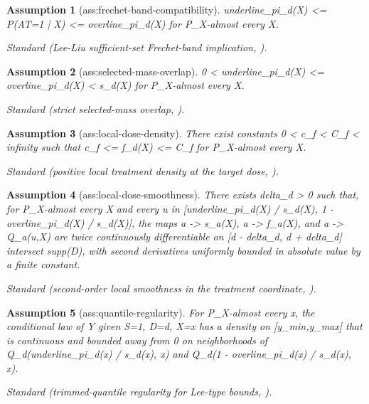\documentclass{article}
\newtheorem{assumption}{Assumption}
\begin{document}
\begin{assumption}[ass:frechet-band-compatibility]\label{ass:frechet-band-compatibility}
underline_pi_d(X) <= P(AT=1 | X) <= overline_pi_d(X) for P_X-almost every X.
\par\smallskip\noindent\emph{Standard} (Lee-Liu sufficient-set Frechet-band implication, \cite{LeeLiu2025ContinuousLee}).
\end{assumption}

\begin{assumption}[ass:selected-mass-overlap]\label{ass:selected-mass-overlap}
0 < underline_pi_d(X) <= overline_pi_d(X) < s_d(X) for P_X-almost every X.
\par\smallskip\noindent\emph{Standard} (strict selected-mass overlap, \cite{LeeLiu2025ContinuousLee}).
\end{assumption}

\begin{assumption}[ass:local-dose-density]\label{ass:local-dose-density}
There exist constants 0 < c_f < C_f < infinity such that c_f <= f_d(X) <= C_f for P_X-almost every X.
\par\smallskip\noindent\emph{Standard} (positive local treatment density at the target dose, \cite{ColangeloLee2025ContinuousDML}).
\end{assumption}

\begin{assumption}[ass:local-dose-smoothness]\label{ass:local-dose-smoothness}
There exists delta_d > 0 such that, for P_X-almost every X and every u in [underline_pi_d(X) / s_d(X), 1 - overline_pi_d(X) / s_d(X)], the maps a -> s_a(X), a -> f_a(X), and a -> Q_a(u,X) are twice continuously differentiable on [d - delta_d, d + delta_d] intersect supp(D), with second derivatives uniformly bounded in absolute value by a finite constant.
\par\smallskip\noindent\emph{Standard} (second-order local smoothness in the treatment coordinate, \cite{ColangeloLee2025ContinuousDML}).
\end{assumption}

\begin{assumption}[ass:quantile-regularity]\label{ass:quantile-regularity}
For P_X-almost every x, the conditional law of Y given S=1, D=d, X=x has a density on [y_min,y_max] that is continuous and bounded away from 0 on neighborhoods of Q_d(underline_pi_d(x) / s_d(x), x) and Q_d(1 - overline_pi_d(x) / s_d(x), x).
\par\smallskip\noindent\emph{Standard} (trimmed-quantile regularity for Lee-type bounds, \cite{LeeLiu2025ContinuousLee}).
\end{assumption}
\end{document}
